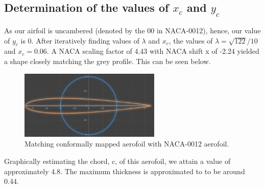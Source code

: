 \documentclass[11pt]{article}
\begin{document}
\subsection*{Determination of the values of $x_c$ and $y_c$ }
As our airfoil is uncambered (denoted by the 00 in NACA-0012), hence, our value of $y_c$ is 0. After iteratively finding values of $\lambda$ and $x_c$, the values of $\lambda = \sqrt{122}/10$ and $x_c = 0.06$. A NACA scaling factor of 4.43 with NACA shift x of -2.24 yielded a shape closely matching the grey profile. This can be seen below.
\begin{figure}[H]
  \centering
  \includegraphics[width=0.6\textwidth]{./img/diagram15.png}
  \caption{Matching conformally mapped aerofoil with NACA-0012 aerofoil.}
\end{figure}
Graphically estimating the chord, $c$, of this aerofoil, we attain a value of approximately 4.8. The maximum thickness is approximated to to be around 0.44.
\end{document}
